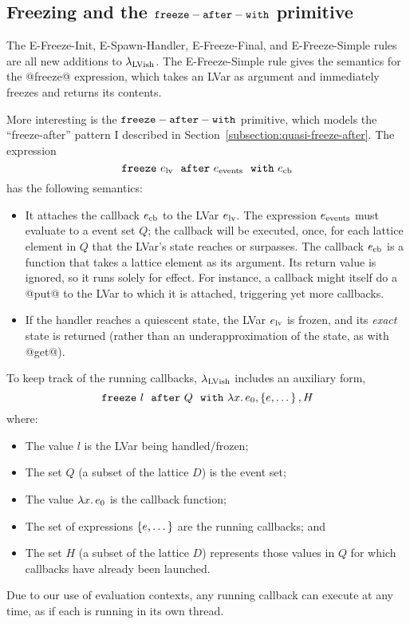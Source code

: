 \subsection{Freezing and the ${\mbox{\texttt{freeze}}-\mbox{\texttt{after}}-\mbox{\texttt{with}}}$ primitive}\label{subsection:language-freezing}

The {\sc E-Freeze-Init}, {\sc E-Spawn-Handler}, {\sc E-Freeze-Final},
and {\sc E-Freeze-Simple} rules are all new additions to
$\lambda_{\textrm{LVish}}$.  The {\sc E-Freeze-Simple} rule gives the semantics
for the @freeze@ expression, which takes an LVar as argument and
immediately freezes and returns its contents.

More interesting is the ${\mbox{\texttt{freeze}}-\mbox{\texttt{after}}-\mbox{\texttt{with}}}$ primitive, which models the
``freeze-after'' pattern I described in
Section~\ref{subsection:quasi-freeze-after}.  The expression
\[ \mbox{\texttt{freeze}}~e_{\rm lv}~~{\mbox{\texttt{after}}}~e_{\rm events}~~{\mbox{\texttt{with}}}~e_{\rm cb} \]
has the following semantics:
\begin{itemize}
\item It attaches the callback $e_{\rm cb}$ to the LVar $e_{\rm lv}$.
  The expression $e_{\rm events}$ must evaluate to a event set $Q$;
  the callback will be executed, once, for each lattice element in $Q$
  that the LVar's state reaches or surpasses.  The callback $e_{\rm
    cb}$ is a function that takes a lattice element as its argument.
  Its return value is ignored, so it runs solely for effect.  For
  instance, a callback might itself do a @put@ to the LVar to which it
  is attached, triggering yet more callbacks.
\item If the handler reaches a quiescent state, the LVar $e_{\rm lv}$
  is frozen, and its \emph{exact} state is returned (rather than an
  underapproximation of the state, as with @get@).
\end{itemize}
To keep track of the running callbacks, $\lambda_{\textrm{LVish}}$ includes an
auxiliary form,
\[
\mbox{\texttt{freeze}}~l~~{\mbox{\texttt{after}}}~Q~~{\mbox{\texttt{with}}}~\lambda x.\,e_0, \left\{e, \dots\right\}, H
\]
where:
\begin{itemize}
\item The value $l$ is the LVar being handled/frozen;
\item The set $Q$ (a subset of the lattice $D$) is the event set;
\item The value $\lambda x.\,e_0$ is the callback function;
\item The set of expressions $\left\{e, \dots\right\}$ are the running
  callbacks; and
\item The set $H$ (a subset of the lattice $D$) represents those
  values in $Q$ for which callbacks have already been launched.
\end{itemize}
Due to our use of evaluation contexts, any running callback can
execute at any time, as if each is running in its own thread.


